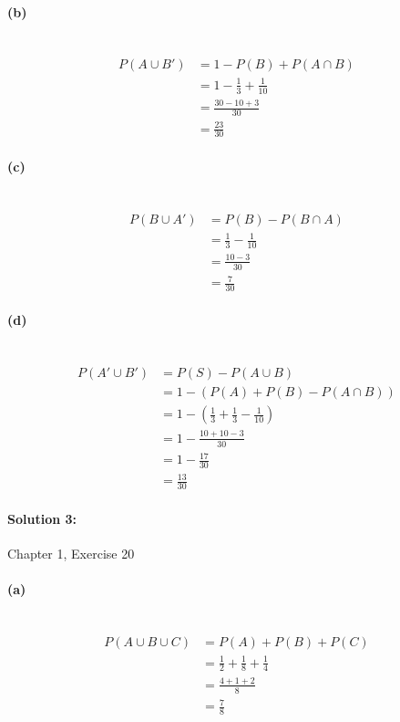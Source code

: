 \documentclass[a4paper]{article}
\begin{document}
\paragraph{(b)} ~\\
\begin{align*} 
P(A \cup B') &= 1 - P(B) + P(A \cap B) \\
             &= 1 - \frac{1}{3} + \frac{1}{10} \\
             &= \frac{30-10+3}{30} \\
             &= \frac{23}{30}
\end{align*}

\paragraph{(c)} ~\\
\begin{align*} 
P(B \cup A') &= P(B) - P(B \cap A) \\
             &= \frac{1}{3} - \frac{1}{10} \\
             &= \frac{10-3}{30} \\
             &= \frac{7}{30}
\end{align*}

\paragraph{(d)} ~\\
\begin{align*} 
P(A' \cup B') &= P(S) - P(A \cup B) \\
              &= 1 - (P(A) + P(B) - P(A \cap B)) \\
              &= 1 - (\frac{1}{3} + \frac{1}{3} - \frac{1}{10}) \\
              &= 1 - \frac{10+10-3}{30} \\
              &= 1 - \frac{17}{30} \\
              &= \frac{13}{30}
\end{align*}

\paragraph{Solution 3:}
Chapter 1, Exercise 20

\paragraph{(a)} ~\\
\begin{align*} 
P(A \cup B \cup C) &= P(A) + P(B) + P(C) \\
                   &= \frac{1}{2} + \frac{1}{8} + \frac{1}{4} \\
                   &= \frac{4+1+2}{8} \\
                   &= \frac{7}{8}
\end{align*}
\end{document}
